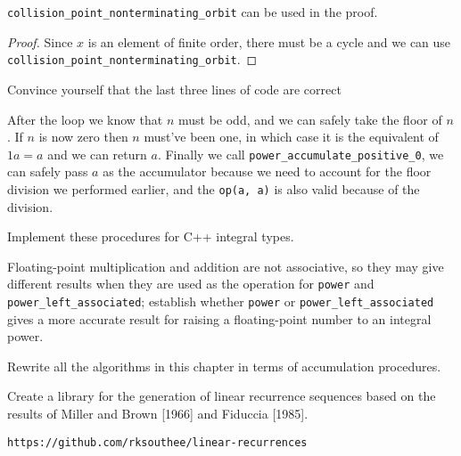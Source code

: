 \begin{lemma}
	\verb|collision_point_nonterminating_orbit| can be used in the proof.
\end{lemma}

\begin{proof}
	Since $x$ is an element of finite order, there must be a cycle and we can use
	\verb|collision_point_nonterminating_orbit|.
\end{proof}

\begin{exercise}
	Convince yourself that the last three lines of code are correct
\end{exercise}

\begin{solution}
	After the loop we know that $n$ must be odd, and we can safely take the
	floor of $n$. If $n$ is now zero then $n$ must've been one, in which case it is the
	equivalent of $1a = a$ and we can return $a$. Finally we call \verb|power_accumulate_positive_0|,
	we can safely pass $a$ as the accumulator because we need to account for the floor division
	we performed earlier, and the \verb|op(a, a)| is also valid because of the division.
\end{solution}

\begin{exercise}
	Implement these procedures for C++ integral types.
\end{exercise}



\begin{project}
	Floating-point multiplication and addition are not associative, so they may give different
	results when they are used as the operation for \verb|power| and \verb|power_left_associated|;
	establish whether \verb|power| or \verb|power_left_associated| gives a more accurate result
	for raising a floating-point number to an integral power.
\end{project}

\begin{exercise}
	Rewrite all the algorithms in this chapter in terms of accumulation procedures.
\end{exercise}

\begin{project}
	Create a library for the generation of linear recurrence sequences based on the results
	of Miller and Brown [1966] and Fiduccia [1985].
\end{project}

\begin{solution}
	\verb|https://github.com/rksouthee/linear-recurrences|
\end{solution}

